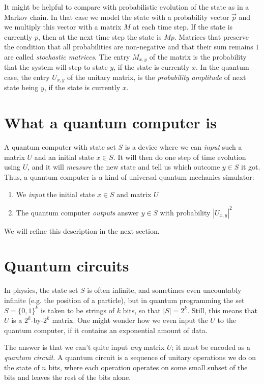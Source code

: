 \documentclass[a4paper, 11pt]{article}
\theoremstyle{definition}
\begin{document}
It might be helpful to compare with probabilistic evolution of the state as in a Markov chain.
In that case we model the state with a probability vector $\vec{p}$ and we multiply this vector with a matrix $M$ at each time step.
If the state is currently $p$, then at the next time step the state is $Mp$.
Matrices that preserve the condition that all probabilities are non-negative and that their sum remains $1$ are called \emph{stochastic matrices}.
The entry $M_{x,y}$ of the matrix is the probability that the system will step to state $y$, if the state is currently $x$.
In the quantum case, the entry $U_{x,y}$ of the unitary matrix, is the \emph{probability amplitude} of next state being $y$, if the state is currently $x$.

\section{What a quantum computer is}

A quantum computer with state set $S$ is a device where we can \emph{input} such a matrix $U$ and an initial state $x \in S$.
It will then do one step of time evolution using $U$, and it will \emph{measure} the new state and tell us which outcome $y \in S$ it got.
Thus, a quantum computer is a kind of universal quantum mechanics simulator:
\begin{enumerate}
  \item We \emph{input} the initial state $x \in S$ and matrix $U$
  \item The quantum computer \emph{outputs} answer $y \in S$ with probability $|U_{x,y}|^2$
\end{enumerate}

We will refine this description in the next section.

\section{Quantum circuits}

In physics, the state set $S$ is often infinite, and sometimes even uncountably infinite (e.g. the position of a particle),
but in quantum programming the set $S = \{0,1\}^k$ is taken to be strings of $k$ bits, so that $|S| = 2^k$.
Still, this means that $U$ is a $2^k$-by-$2^k$ matrix. One might wonder how we even input the $U$ to the quantum computer, if it contains an exponential amount of data.

The answer is that we can't quite input \emph{any} matrix $U$; it must be encoded as a \emph{quantum circuit}.
A quantum circuit is a sequence of unitary operations we do on the state of $n$ bits, where each operation operates on some small subset of the bits and leaves the rest of the bits alone.
\end{document}
